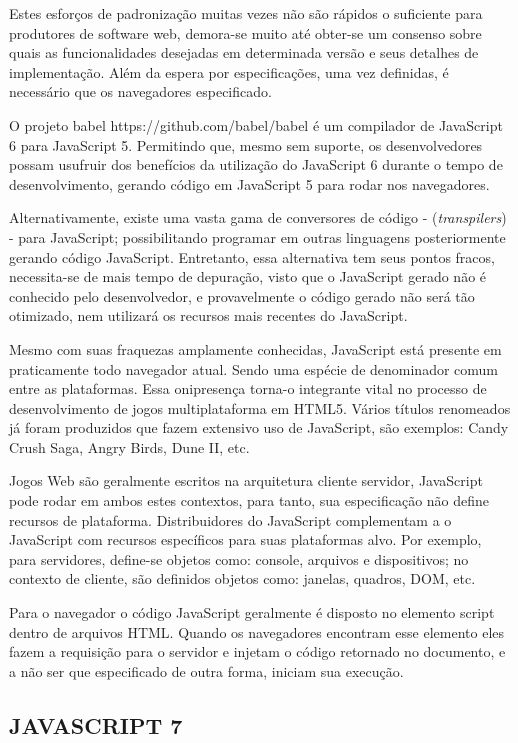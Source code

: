 Estes esforços de padronização muitas vezes não são rápidos
o suficiente para produtores de software web, demora-se muito até
obter-se um consenso sobre quais as funcionalidades desejadas em
determinada versão e seus detalhes de implementação. Além da
espera por especificações, uma vez definidas, é necessário que os
navegadores especificado.

O projeto babel https://github.com/babel/babel é um compilador de
JavaScript 6 para JavaScript 5. Permitindo que, mesmo sem suporte, os
desenvolvedores possam usufruir dos benefícios da utilização do
JavaScript 6 durante o tempo de desenvolvimento, gerando código em
JavaScript 5 para rodar nos navegadores.

Alternativamente, existe uma vasta gama de conversores de código -
(\textit{transpilers}) - para JavaScript; possibilitando programar
em outras linguagens posteriormente gerando código JavaScript.
Entretanto, essa alternativa tem seus pontos fracos, necessita-se
de mais tempo de depuração, visto que o JavaScript gerado não é
conhecido pelo desenvolvedor, e provavelmente o código gerado não
será tão otimizado, nem utilizará os recursos mais recentes do
JavaScript.

Mesmo com suas fraquezas amplamente conhecidas, JavaScript está
presente em praticamente todo navegador atual. Sendo uma espécie de
denominador comum entre as plataformas. Essa onipresença torna-o
integrante vital no processo de desenvolvimento de jogos multiplataforma
em HTML5. Vários títulos renomeados já foram produzidos que fazem
extensivo uso de JavaScript, são exemplos: Candy Crush Saga, Angry
Birds, Dune II, etc.

Jogos Web são geralmente escritos na arquitetura cliente servidor,
JavaScript pode rodar em ambos estes contextos, para tanto, sua
especificação não define recursos de plataforma. Distribuidores do
JavaScript complementam a o JavaScript com recursos específicos para
suas plataformas alvo. Por exemplo, para servidores, define-se objetos como:
console, arquivos e dispositivos; no contexto de cliente,
são definidos objetos como: janelas, quadros, DOM, etc.

Para o navegador o código JavaScript geralmente é disposto no elemento
script dentro de arquivos HTML. Quando os navegadores encontram esse
elemento eles fazem a requisição para o servidor e injetam o código
retornado no documento, e a não ser que especificado de outra forma,
iniciam sua execução.

\subsection{JAVASCRIPT 7}

